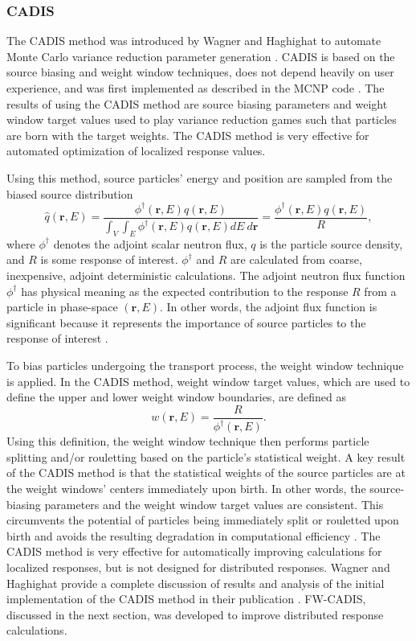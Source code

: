 \documentclass{article} %
\newcommand{\vecr}{\textbf{r}}
\newcommand{\qhat}{\ensuremath{\hat{q}}}
\newcommand{\fwc}{\mbox{FW-CADIS}}
\begin{document}
\subsubsection{CADIS}

The CADIS method was introduced by Wagner and Haghighat to automate Monte
Carlo variance reduction parameter generation \cite{cadis}. CADIS is based on
the source biasing and weight window techniques, does not depend heavily on
user experience, and was first implemented as described 
in the MCNP code \cite{cadis}. The results of using the CADIS method are
source biasing parameters and weight window target values used to play
variance reduction games such that particles are born with the target weights.
The CADIS method is very effective for automated optimization of localized
response values.

Using this method, source particles' energy and position are sampled from the
biased source distribution
%
\begin{equation}
\qhat(\vecr,E) = 
\frac{\phi^{\dagger}(\vecr,E)q(\vecr,E)}
{\int_V\int_E\phi^{\dagger}(\vecr,E)q(\vecr,E) dE\ d\vecr} 
= \frac{\phi^{\dagger}(\vecr,E)q(\vecr,E)}{R},
\label{eq:cadis_sb}
\end{equation}
%
where $\phi^{\dagger}$ denotes the adjoint scalar neutron flux, $q$ is the
particle source density, and $R$ is some response of interest.
$\phi^{\dagger}$ and $R$ are calculated from coarse, inexpensive, adjoint
deterministic calculations. The adjoint neutron flux function $\phi^{\dagger}$
has physical meaning as the expected contribution to the response $R$ from a
particle in phase-space $(\vecr,E)$. In other words, the adjoint flux
function is significant because it represents the importance of source
particles to the response of interest \cite{bg}.

To bias particles undergoing the transport process, the weight window
technique is applied. In the CADIS method, weight window target values, which
are used to define the upper and lower weight window boundaries, are defined
as
%
\begin{equation}
w(\vecr,E) 
= \frac{R}{\phi^{\dagger}(\vecr,E)}.
\label{eq:cadis_tb}
\end{equation}
%
Using this definition, the weight window technique then performs particle
splitting and/or rouletting based on the particle's statistical weight. A key
result of the CADIS method is that the statistical weights of the source
particles are at the weight windows' centers immediately upon birth. In other
words, the source-biasing parameters and the weight window target values are
consistent. This circumvents the potential of particles being immediately
split or rouletted upon birth and avoids the resulting degradation in
computational efficiency \cite{cadis}. The CADIS method is very effective for
automatically improving calculations for localized responses, but is not
designed for distributed responses. Wagner and Haghighat provide a complete
discussion of results and analysis of the initial implementation of the CADIS
method in their publication \cite{cadis}. \fwc, discussed in the next section,
was developed to improve distributed response calculations.
\end{document}
